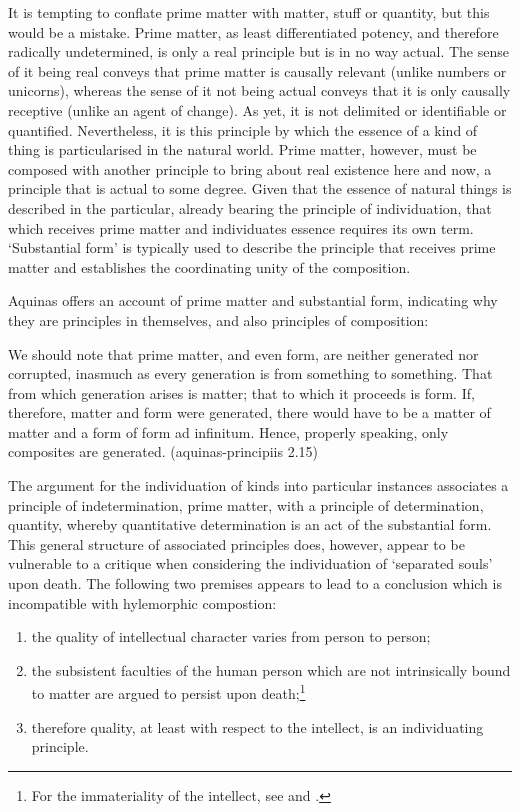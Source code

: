 It is tempting to conflate prime matter with matter, stuff or quantity, but this would be a mistake. Prime matter, as least differentiated potency, and therefore radically undetermined, is only a real principle but is in no way actual. The sense of it being real conveys that prime matter is causally relevant (unlike numbers or unicorns), whereas the sense of it not being actual conveys that it is only causally receptive (unlike an agent of change).
As yet, it is not delimited or identifiable or quantified. Nevertheless, it is this principle by which the essence of a kind of thing is particularised in the natural world. Prime matter, however, must be composed with another principle to bring about real existence here and now, a principle that is actual to some degree. Given that the essence of natural things is described in the particular, already bearing the principle of individuation, that which receives prime matter and individuates essence requires its own term. `Substantial form' is typically used to describe the principle that receives prime matter and establishes the coordinating unity of the composition.

Aquinas offers an account of prime matter and substantial form, indicating why they are principles in themselves, and also principles of composition:
\begin{quoting}
We should note that prime matter, and even form, are neither generated nor corrupted, inasmuch as every generation is from something to something. That from which generation arises is matter; that to which it proceeds is form. If, therefore, matter and form were generated, there would have to be a matter of matter and a form of form ad infinitum. Hence, properly speaking, only composites are generated. (\acrshort{aquinas-principiis} 2.15)
\end{quoting}

The argument for the individuation of kinds into particular instances associates a principle of indetermination, prime matter, with a principle of determination, quantity, whereby quantitative determination is an act of the substantial form. This general structure of associated principles does, however, appear to be vulnerable to a critique when considering the individuation of `separated souls' upon death.
The following two premises appears to lead to a conclusion which is incompatible with hylemorphic compostion:
\begin{enumerate}
\item the quality of intellectual character varies from person to person;
\item the subsistent faculties of the human person which are not intrinsically bound to matter are argued to persist upon death;\footnote{For the immateriality of the intellect, see \textcite[][219--28]{feser2006philosophy} and \textcite[][93--98]{Oderberg2005-ODEHD}.}
\item therefore quality, at least with respect to the intellect, is an individuating principle.
\end{enumerate}

